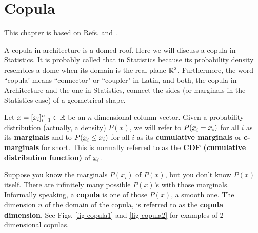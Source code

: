 \chapter{Copula}
\label{ch-copula}

This chapter is based 
on Refs.\cite{wiki-copula}
and \cite{copula-bo}.

A copula in architecture is a domed roof. Here we will discuss a copula in Statistics.
It is probably called that in Statistics
because its probability density resembles a dome when its domain is 
the real plane ${ \mathbb{R}}^2$.
Furthermore,
the word ``copula' means
``connector" or ``coupler" in Latin,
and both,
the copula in Architecture
and the one in Statistics,
connect the sides (or marginals in the
Statistics case) of a geometrical 
shape.

Let $x= [x_i]_{i=1}^n\in{ \mathbb{R}}$ be an $n$ 
dimensional column vector.
Given a probability
distribution (actually, a density) $P(x)$,
we will refer to $P({\underline{x}}_i=x_i)$ for all $i$
as its {\bf marginals}
and to $P({\underline{x}}_i\leq x_i)$ for all $i$
as its {\bf cumulative marginals} or {\bf c-marginals} for short.
This is normally referred
to as the {\bf CDF (cumulative
distribution function)} of ${\underline{x}}_i$.

Suppose you know the marginals $P(x_i)$ 
of  $P(x)$,
but you don't know $P(x)$
itself. There are
infinitely many
possible $P(x)$'s
with those marginals.
Informally
speaking,
a {\bf copula} is one of those
$P(x)$, a smooth one.
The dimension $n$ of
the domain of the copula,
is referred to as the
{\bf copula dimension}.
See Figs. \ref{fig-copula1}
and \ref{fig-copula2}
for examples of 2-dimensional copulas.

